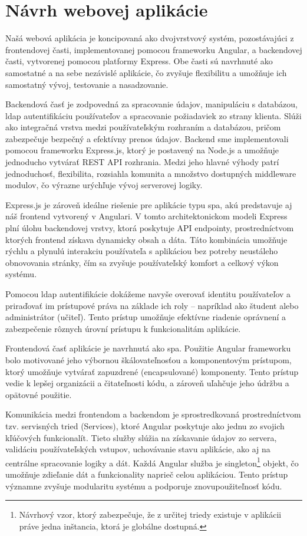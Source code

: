 \section{Návrh webovej aplikácie}
Našá webová aplikácia je koncipovaná ako dvojvrstvový systém, pozostávajúci z frontendovej časti, implementovanej pomocou frameworku Angular, a backendovej časti, vytvorenej pomocou platformy Express.
 Obe časti sú navrhnuté ako samostatné a na sebe nezávislé aplikácie, čo zvyšuje flexibilitu a umožňuje ich samostatný vývoj, testovanie a nasadzovanie.

 Backendová časť je zodpovedná za spracovanie údajov, manipuláciu s databázou, \acrshort{ldap} autentifikáciu používateľov a spracovanie požiadaviek zo strany klienta.
 Slúži ako integračná vrstva medzi používateľským rozhraním a databázou, pričom zabezpečuje bezpečný a efektívny prenos údajov. 
 Backend sme implementovali pomocou frameworku Express.js, ktorý je postavený na Node.js a umožňuje jednoducho vytvárať REST API rozhrania. 
 Medzi jeho hlavné výhody patrí jednoduchosť, flexibilita, rozsiahla komunita a množstvo dostupných middleware modulov, čo výrazne urýchľuje vývoj serverovej logiky.

Express.js je zároveň ideálne riešenie pre aplikácie typu \acrshort{spa}, akú predstavuje aj náš frontend vytvorený v Angulari. 
V tomto architektonickom modeli Express plní úlohu backendovej vrstvy, ktorá poskytuje API endpointy, prostredníctvom ktorých frontend získava dynamicky obsah a dáta. 
Táto kombinácia umožňuje rýchlu a plynulú interakciu používateľa s aplikáciou bez potreby neustáleho obnovovania stránky, čím sa zvyšuje používateľský komfort a celkový výkon systému.

Pomocou \acrshort{ldap} autentifikácie dokážeme navyše overovať identitu používateľov a priraďovať im prístupové práva na základe ich roly – napríklad ako študent alebo administrátor (učiteľ).
 Tento prístup umožňuje efektívne riadenie oprávnení a zabezpečenie rôznych úrovní prístupu k funkcionalitám aplikácie.

Frontendová časť aplikácie je navrhnutá ako \acrfull{spa}.
 Použitie Angular frameworku bolo motivované jeho výbornou škálovateľnosťou a komponentovým prístupom, ktorý umožňuje vytvárať zapuzdrené (encapsulované) komponenty.
  Tento prístup vedie k lepšej organizácii a čitateľnosti kódu, a zároveň uľahčuje jeho údržbu a opätovné použitie.

Komunikácia medzi frontendom a backendom je sprostredkovaná prostredníctvom tzv. servisných tried (Services), ktoré Angular poskytuje ako jednu zo svojich kľúčových funkcionalít.
 Tieto služby slúžia na získavanie údajov zo servera, validáciu používateľských vstupov, uchovávanie stavu aplikácie, ako aj na centrálne spracovanie logiky a dát. 
 Každá Angular služba je singleton\footnote{Návrhový vzor, ktorý zabezpečuje, že z určitej triedy existuje v aplikácii práve jedna inštancia, ktorá je globálne dostupná.} objekt, čo umožňuje zdieľanie dát a funkcionality naprieč celou aplikáciou. 
 Tento prístup významne zvyšuje modularitu systému a podporuje znovupoužiteľnosť kódu.

